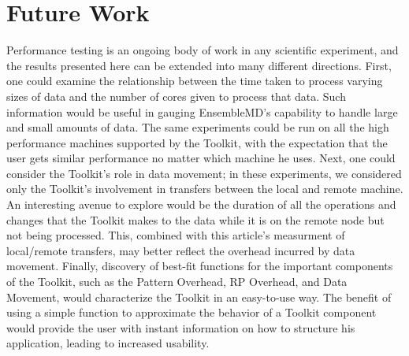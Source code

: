 \documentclass[]{article}
\begin{document}
\section{Future Work}
	Performance testing is an ongoing body of work in any scientific experiment, and the results presented here can be extended into many different directions. First, one could examine the relationship between the time taken to process varying sizes of data and the number of cores given to process that data. Such information would be useful in gauging EnsembleMD's capability to handle large and small amounts of data. The same experiments could be run on all the high performance machines supported by the Toolkit, with the expectation that the user gets similar performance no matter which machine he uses. Next, one could consider the Toolkit's role in data movement; in these experiments, we considered only the Toolkit's involvement in transfers between the local and remote machine. An interesting avenue to explore would be the duration of all the operations and changes that the Toolkit makes to the data while it is on the remote node but not being processed. This, combined with this article's measurment of local/remote transfers, may better reflect the overhead incurred by data movement. Finally, discovery of best-fit functions for the important components of the Toolkit, such as the Pattern Overhead, RP Overhead, and Data Movement, would characterize the Toolkit in an easy-to-use way. The benefit of using a simple function to approximate the behavior of a Toolkit component would provide the user with instant information on how to structure his application, leading to increased usability.
\end{document}

